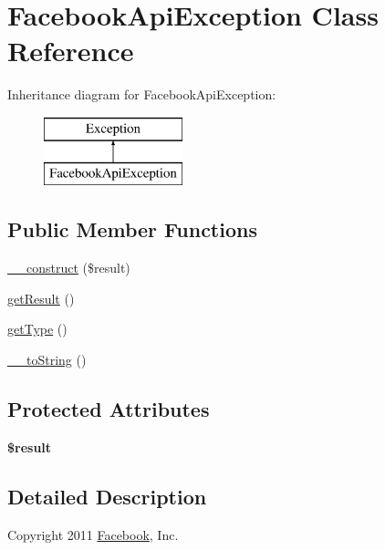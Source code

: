 \hypertarget{class_facebook_api_exception}{\section{Facebook\-Api\-Exception Class Reference}
\label{class_facebook_api_exception}
}
Inheritance diagram for Facebook\-Api\-Exception\-:\begin{figure}[H]
\begin{center}
\leavevmode
\includegraphics[height=2.000000cm]{class_facebook_api_exception}
\end{center}
\end{figure}
\subsection*{Public Member Functions}
\begin{DoxyCompactItemize}
\item 
\hyperlink{class_facebook_api_exception_aa7d9da69694e5a4bf2f0c1d7e85eb0f1}{\-\_\-\-\_\-construct} (\$result)
\item 
\hyperlink{class_facebook_api_exception_ae077eb8a032a325ceb939bfabfa5f472}{get\-Result} ()
\item 
\hyperlink{class_facebook_api_exception_a830b5c75df72b32396701bc563fbe3c7}{get\-Type} ()
\item 
\hyperlink{class_facebook_api_exception_a7516ca30af0db3cdbf9a7739b48ce91d}{\-\_\-\-\_\-to\-String} ()
\end{DoxyCompactItemize}
\subsection*{Protected Attributes}
\begin{DoxyCompactItemize}
\item 
\hypertarget{class_facebook_api_exception_a112ef069ddc0454086e3d1e6d8d55d07}{{\bfseries \$result}}\label{class_facebook_api_exception_a112ef069ddc0454086e3d1e6d8d55d07}

\end{DoxyCompactItemize}


\subsection{Detailed Description}
Copyright 2011 \hyperlink{class_facebook}{Facebook}, Inc.

